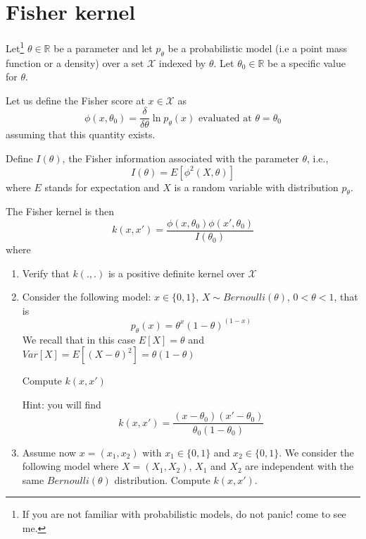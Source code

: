 \documentclass{article}[12pt]
\begin{document}
\section{Fisher kernel} 
Let\footnote{If you are not familiar with probabilistic models, do not panic! come to see me.} $\theta \in \mathbb{R}$ be a parameter and let $p_\theta$ be a probabilistic model (i.e a point mass function or a density) over a set $\mathcal{X}$ indexed by $\theta$. Let $\theta_0 \in \mathbb{R}$ be a specific value for $\theta$.

Let us define the Fisher score at $x \in \mathcal{X}$ as
\begin{equation}
\phi(x,\theta_0) = \frac{\delta}{\delta \theta} \ln p_\theta(x) \mbox{ evaluated at } \theta=\theta_0
\end{equation}
assuming that this quantity exists. 

Define $I(\theta)$, the Fisher information associated with the parameter $\theta$, i.e., 
\begin{equation}
I(\theta)=E[\phi^2(X,\theta)]
\end{equation}
where $E$ stands for expectation and $X$ is a random variable with distribution $p_\theta$. 

The Fisher kernel is then 
\begin{equation}
k(x,x')=\frac{\phi(x,\theta_0)\phi(x',\theta_0)}{I(\theta_0)}
\end{equation}
where 
\begin{enumerate}
\item Verify that $k(.,.)$ is a positive definite kernel over $\mathcal{X}$
\item Consider the following model: $x \in \{0,1\}$, $X \sim Bernoulli(\theta)$, $0 < \theta < 1$, that is
\begin{equation}
p_\theta(x)=\theta^x(1-\theta)^{(1-x)} 
\end{equation}
We recall that in this case $E[X]=\theta$ and $Var[X]=E[(X-\theta)^2]=\theta(1-\theta)$

Compute $k(x,x')$

Hint: you will find $$k(x,x')=\frac{(x-\theta_0)(x'-\theta_0)}{\theta_0(1-\theta_0)}$$
\item
Assume now $x=(x_1,x_2)$ with $x_1 \in \{0,1\}$ and $x_2 \in \{0,1\}$. 
We consider the following model where $X=(X_1,X_2)$, $X_1$ and $X_2$ are independent with the same $Bernoulli(\theta)$ distribution. 
Compute $k(x,x')$. 
\end{enumerate}
 
\end{document}
